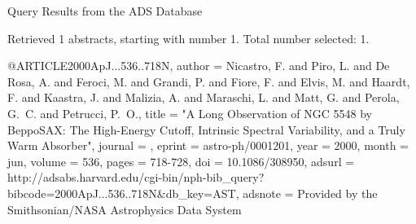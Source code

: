 Query Results from the ADS Database


Retrieved 1 abstracts, starting with number 1.  Total number selected: 1.

@ARTICLE{2000ApJ...536..718N,
   author = {{Nicastro}, F. and {Piro}, L. and {De Rosa}, A. and {Feroci}, M. and 
	{Grandi}, P. and {Fiore}, F. and {Elvis}, M. and {Haardt}, F. and 
	{Kaastra}, J. and {Malizia}, A. and {Maraschi}, L. and {Matt}, G. and 
	{Perola}, G.~C. and {Petrucci}, P.~O.},
    title = "{A Long Observation of NGC 5548 by BeppoSAX: The High-Energy Cutoff, Intrinsic Spectral Variability, and a Truly Warm Absorber}",
  journal = {\apj},
   eprint = {astro-ph/0001201},
     year = 2000,
    month = jun,
   volume = 536,
    pages = {718-728},
      doi = {10.1086/308950},
   adsurl = {http://adsabs.harvard.edu/cgi-bin/nph-bib_query?bibcode=2000ApJ...536..718N&db_key=AST},
  adsnote = {Provided by the Smithsonian/NASA Astrophysics Data System}
}


